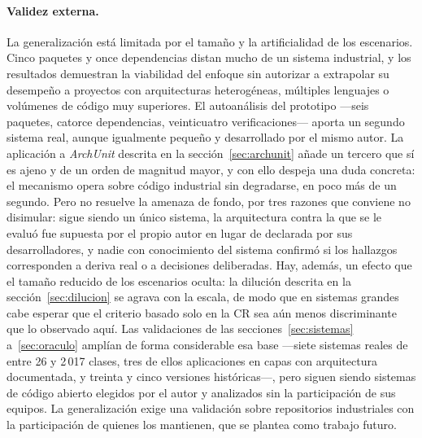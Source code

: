 \paragraph{Validez externa.} La generalización está limitada por el tamaño y la artificialidad de los escenarios. Cinco paquetes y once dependencias distan mucho de un sistema industrial, y los resultados demuestran la viabilidad del enfoque sin autorizar a extrapolar su desempeño a proyectos con arquitecturas heterogéneas, múltiples lenguajes o volúmenes de código muy superiores. El autoanálisis del prototipo ---seis paquetes, catorce dependencias, veinticuatro verificaciones--- aporta un segundo sistema real, aunque igualmente pequeño y desarrollado por el mismo autor. La aplicación a \textit{ArchUnit} descrita en la sección~\ref{sec:archunit} añade un tercero que sí es ajeno y de un orden de magnitud mayor, y con ello despeja una duda concreta: el mecanismo opera sobre código industrial sin degradarse, en poco más de un segundo. Pero no resuelve la amenaza de fondo, por tres razones que conviene no disimular: sigue siendo un único sistema, la arquitectura contra la que se le evaluó fue supuesta por el propio autor en lugar de declarada por sus desarrolladores, y nadie con conocimiento del sistema confirmó si los hallazgos corresponden a deriva real o a decisiones deliberadas. Hay, además, un efecto que el tamaño reducido de los escenarios oculta: la dilución descrita en la sección~\ref{sec:dilucion} se agrava con la escala, de modo que en sistemas grandes cabe esperar que el criterio basado solo en la CR sea aún menos discriminante que lo observado aquí. Las validaciones de las secciones~\ref{sec:sistemas} a~\ref{sec:oraculo} amplían de forma considerable esa base ---siete sistemas reales de entre 26 y 2\,017 clases, tres de ellos aplicaciones en capas con arquitectura documentada, y treinta y cinco versiones históricas---, pero siguen siendo sistemas de código abierto elegidos por el autor y analizados sin la participación de sus equipos. La generalización exige una validación sobre repositorios industriales con la participación de quienes los mantienen, que se plantea como trabajo futuro.

